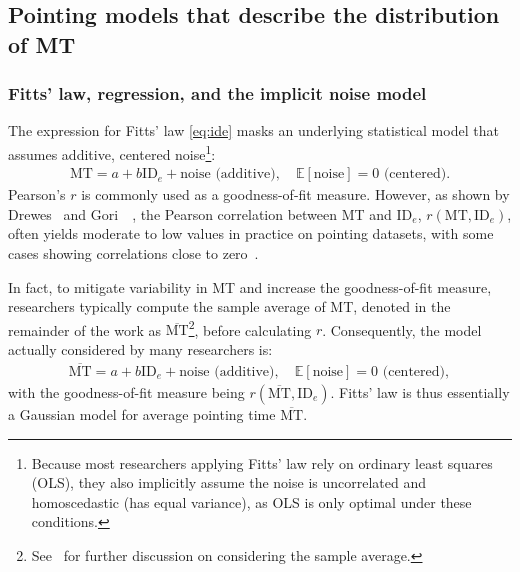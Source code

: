 \documentclass[acmlarge, manuscript,review]{acmart}
\newcommand{\mmt}{\ensuremath{\overline{\mt}}\xspace}
\newcommand{\mt}{\ensuremath{{\text{MT}}}\xspace}
\newcommand{\ide}{\ensuremath{{\text{ID}_e}}\xspace}
\begin{document}
\subsection{Pointing models that describe the distribution of MT}
\subsubsection{Fitts' law, regression, and the implicit noise model \label{subs:rw::fitts}}
The expression for Fitts' law \autoref{eq:ide} masks an underlying statistical model that assumes additive, centered noise\footnote{Because most researchers applying Fitts' law rely on ordinary least squares (OLS), they also implicitly assume the noise is uncorrelated and homoscedastic (has equal variance), as OLS is only optimal under these conditions.}:
\begin{align} \mt = a + b\ide + \text{noise (additive)}, \quad \mathbb{E}[\text{noise}] = 0 \text{ (centered)}. \label{eq:mt} \end{align}
Pearson's $r$ is commonly used as a goodness-of-fit measure. %
However, as shown by Drewes~\cite{drewes2013} and Gori~\etal~\cite{gori2018chi}, the Pearson correlation between MT and \ide, $r(\mt, \ide)$, often yields moderate to low values in practice on pointing datasets, with some cases showing correlations close to zero~\cite{gori2018tochi}.

In fact, to mitigate variability in MT and increase the goodness-of-fit measure, researchers typically compute the sample average of MT, denoted in the remainder of the work as \mmt\footnote{See~\cite{gori2017two} for further discussion on considering the sample average.}, before calculating $r$. Consequently, the model actually considered by many researchers is:
\begin{align}
	\mmt = a + b\ide + \text{noise (additive)}, \quad \mathbb{E}[\text{noise}] = 0 \text{ (centered)}, \label{eq:mmt}
\end{align}
with the goodness-of-fit measure being $r(\mmt, \ide)$. Fitts' law is thus essentially a Gaussian model for average pointing time \mmt.
\end{document}
